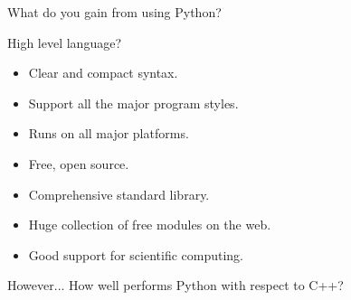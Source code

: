 \begin{frame}{What do you gain from using Python?}
   \begin{scriptsize}

      \begin{alertblock}{High level language?}
        \begin{itemize}
          \item Clear and compact syntax.
          \item Support all the major program styles. 
          \item Runs on all major platforms.
          \item Free, open source.
          \item Comprehensive standard library.
          \item Huge collection of free modules on the web.
          \item Good support for scientific computing.
        \end{itemize}
      \end{alertblock}
  \end{scriptsize}
  
  \begin{alertblock}{However...}
     How well performs Python with respect to C++?
  \end{alertblock}
\end{frame}


